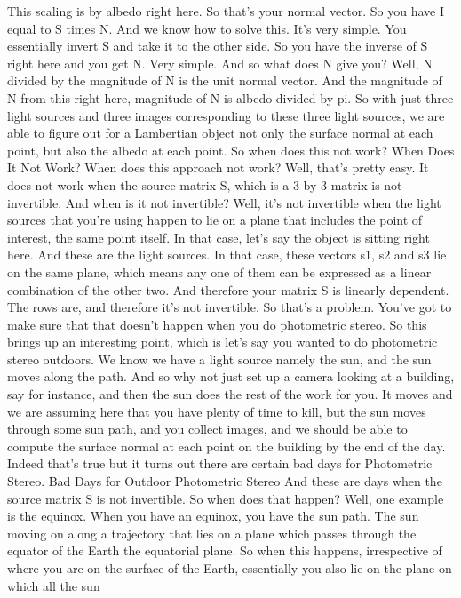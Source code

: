\documentclass[12pt]{article}
\begin{document}
This scaling is by albedo right here.
So that's your normal vector.
So you have I equal to S times N.
And we know how to solve this.
It's very simple.
You essentially invert S and take it to the other side.
So you have the inverse of S right here
and you get N. Very simple.
And so what does N give you?
Well, N divided by the magnitude of N is the unit
normal vector.
And the magnitude of N from this right here, magnitude of N
is albedo divided by pi.
So with just three light sources and three images corresponding
to these three light sources, we are
able to figure out for a Lambertian object not only
the surface normal at each point,
but also the albedo at each point.
So when does this not work?
When Does It Not Work?
When does this approach not work?
Well, that's pretty easy.
It does not work when the source matrix S, which is a 3
by 3 matrix is not invertible.
And when is it not invertible?
Well, it's not invertible when the light sources that you're
using happen to lie on a plane that
includes the point of interest, the same point itself.
In that case, let's say the object is sitting right here.
And these are the light sources.
In that case, these vectors s1, s2 and s3
lie on the same plane, which means any one of them
can be expressed as a linear combination of the other two.
And therefore your matrix S is linearly dependent.
The rows are, and therefore it's not invertible.
So that's a problem.
You've got to make sure that that doesn't happen
when you do photometric stereo.
So this brings up an interesting point,
which is let's say you wanted to do photometric stereo outdoors.
We know we have a light source namely the sun,
and the sun moves along the path.
And so why not just set up a camera looking at a building,
say for instance, and then the sun
does the rest of the work for you.
It moves and we are assuming here
that you have plenty of time to kill,
but the sun moves through some sun path,
and you collect images, and we should
be able to compute the surface normal at each point
on the building by the end of the day.
Indeed that's true but it turns out
there are certain bad days for Photometric Stereo.
Bad Days for Outdoor Photometric Stereo
And these are days when the source matrix S is not
invertible.
So when does that happen?
Well, one example is the equinox.
When you have an equinox, you have the sun path.
The sun moving on along a trajectory
that lies on a plane which passes
through the equator of the Earth the equatorial plane.
So when this happens, irrespective
of where you are on the surface of the Earth,
essentially you also lie on the plane on which all the sun
\end{document}
